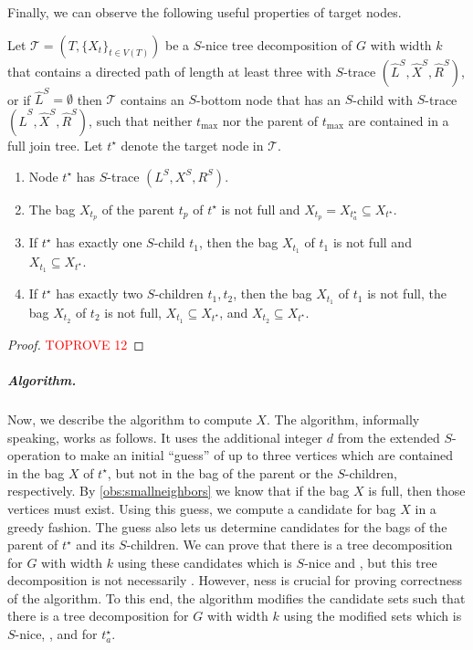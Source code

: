 \documentclass[a4paper,UKenglish,cleveref, autoref, thm-restate, numberwithinsect]{lipics-v2021}
\newcounter{algorithm}
\newcommand{\slim}{\text{slim}\xspace}
\newcommand{\topheavy}{\text{top-heavy}\xspace}
\begin{document}
Finally, we can observe the following useful properties of target nodes.
\begin{observation}\label{obs:smallneighbors}
Let $\mathcal{T}=(T,\{X_t\}_{t\in V(T)})$ be a \slim $S$-nice tree decomposition of $G$ with width $k$ that contains a directed path of length at least three with $S$-trace $(\hat{L}^S, \hat{X}^S, \hat{R}^S)$, or if $\hat{L}^S=\emptyset$ then $\mathcal{T}$ contains an $S$-bottom node that has an $S$-child with $S$-trace $(\hat{L}^S, \hat{X}^S, \hat{R}^S)$, such that neither $t_{\max}$ nor the parent of $t_{\max}$ are contained in a full join tree. Let ${t^\star}$ denote the target node in $\mathcal{T}$.
\begin{enumerate}
	\item Node ${t^\star}$ has $S$-trace $(L^S, X^S, R^S)$. \item The bag $X_{t_p}$ of the parent $t_p$ of ${t^\star}$ is not full and  $X_{t_p}=X_{t^\star_a}\subseteq X_{t^\star}$.
	\item If ${t^\star}$ has exactly one $S$-child $t_1$, then the bag $X_{t_1}$ of $t_1$ is not full and $X_{t_1}\subseteq X_{t^\star}$. \item If ${t^\star}$ has exactly two $S$-children $t_1, t_2$, then 
the bag $X_{t_1}$ of $t_1$ is not full,
the bag $X_{t_2}$ of $t_2$ is not full, $X_{t_1}\subseteq X_{t^\star}$, and $X_{t_2}\subseteq X_{t^\star}$. \end{enumerate}
\end{observation}
\begin{proof}\textcolor{red}{TOPROVE 12}\end{proof}


\subparagraph{Algorithm.}
Now, we describe the algorithm to compute $X$. The algorithm, informally speaking, works as follows. 
It uses the additional integer $d$ from the extended $S$-operation to make an initial ``guess'' of up to three vertices which are contained in the bag $X$ of $t^\star$, but not in the bag of the parent or the $S$-children, respectively. By \cref{obs:smallneighbors} we know that if the bag $X$ is full, then those vertices must exist. Using this guess, we compute a candidate for bag $X$ in a greedy fashion.
The guess also lets us determine candidates for the bags of the parent of $t^\star$ and its $S$-children.
We can prove that there is a tree decomposition for $G$ with width $k$ using these candidates which is $S$-nice and \slim, but this tree decomposition is not necessarily \topheavy. However, {\topheavy}ness is crucial for proving correctness of the algorithm. To this end, the algorithm modifies the candidate sets such that there is a tree decomposition for $G$ with width $k$ using the modified sets which is $S$-nice, \slim, and \topheavy for $t^\star_a$. 
\end{document}
